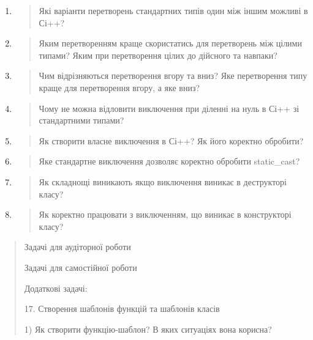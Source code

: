 \documentclass[]{article}
\begin{document}
\begin{enumerate}
\def\labelenumi{\arabic{enumi})}
\item
  \begin{quote}
  Які варіанти перетворень стандартних типів один між іншим можливі в
  Сі++?
  \end{quote}
\item
  \begin{quote}
  Яким перетворенням краще скористатись для перетворень між цілими
  типами? Яким при перетворення цілих до дійсного та навпаки?
  \end{quote}
\item
  \begin{quote}
  Чим відрізняються перетворення вгору та вниз? Яке перетворення типу
  краще для перетворення вгору, а яке вниз?
  \end{quote}
\item
  \begin{quote}
  Чому не можна відловити виключення при діленні на нуль в Сі++ зі
  стандартними типами?
  \end{quote}
\item
  \begin{quote}
  Як створити власне виключення в Сі++? Як його коректно обробити?
  \end{quote}
\item
  \begin{quote}
  Яке стандартне виключення дозволяє коректно обробити static\_cast?
  \end{quote}
\item
  \begin{quote}
  Як складнощі виникають якщо виключення виникає в деструкторі класу?
  \end{quote}
\item
  \begin{quote}
  Як коректно працювати з виключенням, що виникає в конструкторі класу?
  \end{quote}
\end{enumerate}

\begin{quote}
Задачі для аудіторної роботи

Задачі для самостійної роботи

Додаткові задачі:

17. Створення шаблонів функцій та шаблонів класів

1) Як створити функцію-шаблон? В яких ситуаціях вона корисна?
\end{quote}
\end{document}
